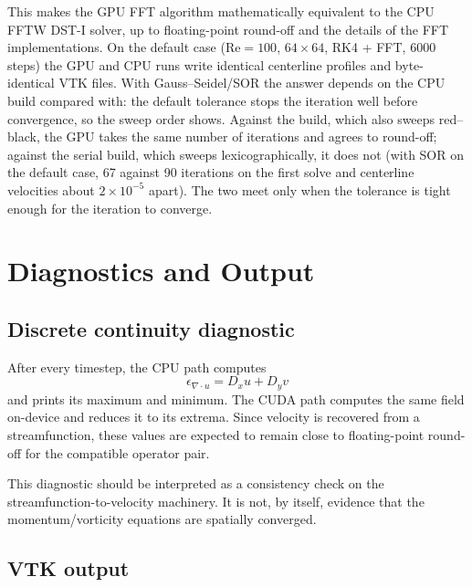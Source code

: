 \documentclass[11pt,a4paper]{article}
\newcommand{\Rey}{\mathrm{Re}}
\newcommand{\code}[1]{\texttt{\detokenize{#1}}}
\begin{document}
This makes the GPU FFT algorithm mathematically equivalent to the CPU FFTW DST-I solver, up to floating-point round-off and the details of the FFT implementations.  On the default case ($\Rey=100$, $64\times64$, RK4 + FFT, 6000 steps) the GPU and CPU runs write identical centerline profiles and byte-identical VTK files.  With Gauss--Seidel/SOR the answer depends on the CPU build compared with: the default tolerance stops the iteration well before convergence, so the sweep order shows.  Against the \code{OPENMP=1} build, which also sweeps red--black, the GPU takes the same number of iterations and agrees to round-off; against the serial build, which sweeps lexicographically, it does not (with SOR on the default case, 67 against 90 iterations on the first solve and centerline velocities about $2\times10^{-5}$ apart).  The two meet only when the tolerance is tight enough for the iteration to converge.

\section{Diagnostics and Output}

\subsection{Discrete continuity diagnostic}

After every timestep, the CPU path computes
\begin{equation}
\epsilon_{\nabla\cdot u}=D_xu+D_yv
\end{equation}
and prints its maximum and minimum.  The CUDA path computes the same field on-device and reduces it to its extrema.  Since velocity is recovered from a streamfunction, these values are expected to remain close to floating-point round-off for the compatible operator pair.

This diagnostic should be interpreted as a consistency check on the streamfunction-to-velocity machinery.  It is not, by itself, evidence that the momentum/vorticity equations are spatially converged.

\subsection{VTK output}
\end{document}

